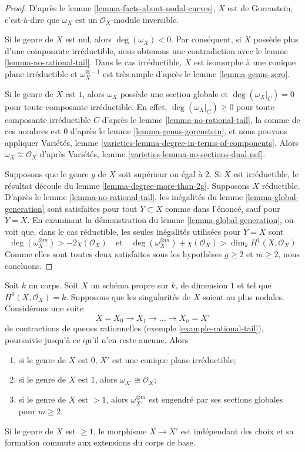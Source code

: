 \begin{proof}
D'après le lemme \ref{lemma-facts-about-nodal-curves}, $X$ est de Gorenstein, c'est-à-dire que $\omega_X$ est un $\mathcal{O}_X$-module inversible.

\medskip\noindent
Si le genre de $X$ est nul, alors $\deg(\omega_X) < 0$. Par conséquent, si $X$ possède plus d'une composante irréductible, nous obtenons une contradiction avec le lemme \ref{lemma-no-rational-tail}. Dans le cas irréductible, $X$ est isomorphe à une conique plane irréductible et $\omega_X^{\otimes -1}$ est très ample d'après le lemme \ref{lemma-genus-zero}.

\medskip\noindent
Si le genre de $X$ est $1$, alors $\omega_X$ possède une section globale et $\deg(\omega_X|_C) = 0$ pour toute composante irréductible. En effet, $\deg(\omega_X|_C) \geq 0$ pour toute composante irréductible $C$ d'après le lemme \ref{lemma-no-rational-tail}, la somme de ces nombres est $0$ d'après le lemme \ref{lemma-genus-gorenstein}, et nous pouvons appliquer Variétés, lemme \ref{varieties-lemma-degree-in-terms-of-components}. Alors $\omega_X \cong \mathcal{O}_X$ d'après Variétés, lemme \ref{varieties-lemma-no-sections-dual-nef}.

\medskip\noindent
Supposons que le genre $g$ de $X$ soit supérieur ou égal à $2$. Si $X$ est irréductible, le résultat découle du lemme \ref{lemma-degree-more-than-2g}. Supposons $X$ réductible. D'après le lemme \ref{lemma-no-rational-tail}, les inégalités du lemme \ref{lemma-global-generation} sont satisfaites pour tout $Y \subset X$ comme dans l'énoncé, sauf pour $Y = X$. En examinant la démonstration du lemme \ref{lemma-global-generation}, on voit que, dans le cas réductible, les seules inégalités utilisées pour $Y = X$ sont $$
\deg(\omega_X^{\otimes m}) > -2 \chi(\mathcal{O}_X)
\quad\text{et}\quad
\deg(\omega_X^{\otimes m}) + \chi(\mathcal{O}_X) > \dim_k H^1(X, \mathcal{O}_X)
$$ Comme elles sont toutes deux satisfaites sous les hypothèses $g \geq 2$ et $m \geq 2$, nous concluons.
\end{proof}

\begin{lemma}
\label{lemma-contracting-rational-tails}
Soit $k$ un corps. Soit $X$ un schéma propre sur $k$, de dimension $1$ et tel que $H^0(X, \mathcal{O}_X) = k$. Supposons que les singularités de $X$ soient au plus nodales. Considérons une suite $$
X = X_0 \to X_1 \to \ldots \to X_n = X'
$$ de contractions de queues rationnelles (exemple \ref{example-rational-tail}), poursuivie jusqu'à ce qu'il n'en reste aucune. Alors \begin{enumerate} \item si le genre de $X$ est $0$, $X'$ est une conique plane irréductible; \item si le genre de $X$ est $1$, alors $\omega_{X'} \cong \mathcal{O}_X$; \item si le genre de $X$ est $> 1$, alors $\omega_{X'}^{\otimes m}$ est engendré par ses sections globales pour $m \geq 2$. \end{enumerate} Si le genre de $X$ est $\geq 1$, le morphisme $X \to X'$ est indépendant des choix et sa formation commute aux extensions du corps de base.
\end{lemma}

